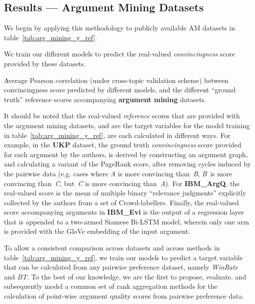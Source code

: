 \documentclass[notitlepage,12pt]{jedm}
\begin{document}
\subsection{Results --- Argument Mining Datasets}
We begin by applying this methodology to publicly available AM 
datasets in table~\ref{tab:arg_mining_y_ref}.

We train our different models to predict the real-valued 
\textit{convincingness} score provided by these datasets.

\begin{table}
	\caption{Average Pearson correlation (under cross-topic validation scheme) between
		convincingness score predicted by different models, and the 
		different ``ground truth'' reference scores accompanying \textbf{argument mining}
		datasets.}
	\label{tab:arg_mining_y_ref}
        \centering
	
\end{table}

It should be noted that the real-valued \textit{reference} scores that are 
provided with the argument mining datasets, and are the target variables for 
the model training in table~\ref{tab:arg_mining_y_ref}, are each 
calculated in different ways. 
For example, in the \textbf{UKP} dataset, the ground truth 
\textit{convincingness} score provided for each argument by the authors, is 
derived by constructing an argument graph, and calculating a variant of the 
PageRank score, after removing cycles induced by the pairwise data (e.g. cases 
where \textit{A} is more convincing than~\textit{B}, \textit{B}~is more 
convincing 
than~\textit{C}, but~\textit{C} is more convincing than~\textit{A}).
For \textbf{IBM\_ArgQ}, the real-valued score is the mean of multiple binary 
``relevance judgments'' explicitly collected by the authors from a set of 
Crowd-labellers.
Finally, the real-valued score accompanying arguments in \textbf{IBM\_Evi} is
the output of a regression layer that is appended to a two-armed Siamese 
Bi-LSTM model, wherein only one arm is provided with the GloVe embedding of 
the input argument.

To allow a consistent comparison across datasets and across methods in table~\ref{tab:arg_mining_y_ref}, we train our models to predict a target variable 
that can be calculated from any pairwise preference dataset, namely 
\textit{WinRate} and \textit{BT}.
To the best of our knowledge, we are the first to propose, evaluate, and 
subsequently model a common set of rank aggregation methods for the calculation 
of point-wise argument quality scores from pairwise preference data.
\end{document}
